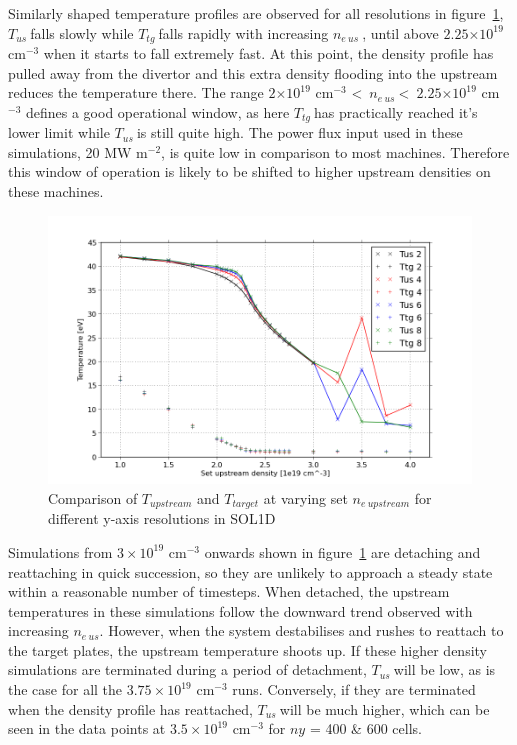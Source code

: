 \documentclass[12pt]{article}  %
\providecommand{\e}[1]{\ensuremath{\times 10^{#1}}} %
\providecommand{\noNe}[1]{{${#1}\times 10^{19}$ cm$^{-3}$}} %
\providecommand{\pow}[1]{{$^{#1}$}} %
\providecommand{\neus}{$n_{e~us}~$} %
\providecommand{\Tus}{$T_{us}~$} %
\providecommand{\Ttg}{$T_{tg}~$} %
\providecommand{\Neus}{$n_{e~us}$} %
\begin{document}
Similarly shaped temperature profiles are observed for all resolutions in figure~\ref{figTT_COMBOstretch4}, \Tus falls slowly while \Ttg falls rapidly with increasing \neus, until above $2.25\e{19}$ cm$^{-3}$ when it starts to fall extremely fast. At this point, the density profile has pulled away from the divertor and this extra density flooding into the upstream reduces the temperature there. The range $2\e{19}$ cm$^{-3}$ \textless~\neus \textless~$2.25\e{19}$ cm$^{-3}$ defines a good operational window, as here \Ttg has practically reached it's lower limit while \Tus is still quite high. The power flux input used in these simulations, 20 MW m\pow{-2}, is quite low in comparison to most machines. Therefore this window of operation is likely to be shifted to higher upstream densities on these machines.

\begin{figure}
\includegraphics[scale=0.5]{Figures/sol1d/TT_COMBOstretch4.png}
\centering
\caption{Comparison of $T_{upstream}$ and $T_{target}$ at varying set $n_{e~upstream}$ for different y-axis resolutions in SOL1D}\label{figTT_COMBOstretch4}
\end{figure}

Simulations from \noNe{3} onwards shown in figure~\ref{figTT_COMBOstretch4} are detaching and reattaching in quick succession, so they are unlikely to approach a steady state within a reasonable number of timesteps. When detached, the upstream temperatures in these simulations follow the downward trend observed with increasing \Neus. However, when the system destabilises and rushes to reattach to the target plates, the upstream temperature shoots up. If these higher density simulations are terminated during a period of detachment, \Tus will be low, as is the case for all the \noNe{3.75} runs. Conversely, if they are terminated when the density profile has reattached, \Tus will be much higher, which can be seen in the data points at \noNe{3.5} for $ny$ = 400 \& 600 cells. 
\end{document}
